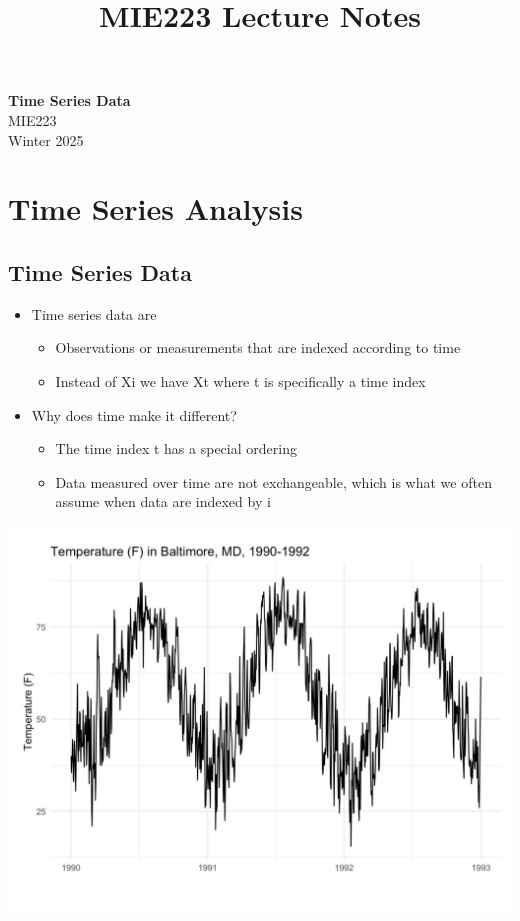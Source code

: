\documentclass[11pt]{article}
\theoremstyle{definition}
\begin{document}
\setcounter{section}{0}
\title{MIE223 Lecture Notes}

\thispagestyle{empty}

\begin{center}
{\LARGE \bf Time Series Data}\\
{\large MIE223}\\
Winter 2025
\end{center}
\section{Time Series Analysis}
\subsection{Time Series Data}
\begin{itemize}
  \item Time series data are
  \begin{itemize}
    \item Observations or measurements that
    are indexed according to time
    \item Instead of Xi we have Xt where t is
    specifically a time index  
  \end{itemize}
  \item Why does time make it different?
  \begin{itemize}
    \item The time index t has a special ordering  
    \item Data measured over time are not
    exchangeable, which is what we often
    assume when data are indexed by i
  \end{itemize}
\end{itemize}
\includegraphics[width=\textwidth/2]{1.png}
\end{document}
